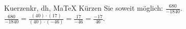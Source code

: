 \begin{MAufgabe}{Kuerzen}{kr, dh, MaTeX}
K\"urzen Sie soweit m\"oglich: $\frac{680}{-1840}$.\\ 
\ifLsg\MLoesung
\quad $\frac{680}{-1840}=\frac{(40)\cdot(17)}{(40)\cdot(-46)}=\frac{17}{-46}=\frac{-17}{46}$.\else\relax\fi
 \end{MAufgabe}